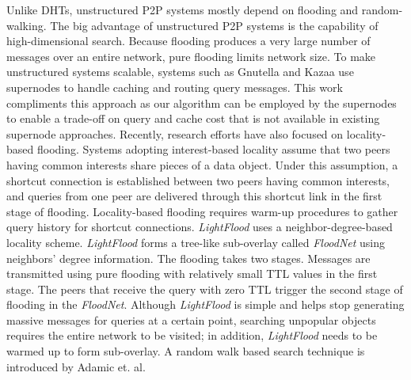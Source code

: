 \documentclass[conference]{IEEEtran}
\begin{document}

Unlike DHTs, unstructured P2P systems mostly depend on flooding and random-walking.
The big advantage of unstructured P2P systems 
is the capability of high-dimensional search.
Because flooding produces a very large number of
messages over an entire network, pure flooding limits network size. 
To make unstructured systems scalable, systems such as Gnutella and
Kazaa use supernodes to handle caching and routing query messages.
This work compliments this approach as our algorithm can be employed
by the supernodes to enable a trade-off on query and cache cost that
is not available in existing supernode approaches.
Recently, research efforts have also focused on locality-based flooding. Systems 
adopting interest-based locality\cite{Guo05,SMZ03} assume that 
two peers having common interests share pieces of a data object. 
Under this assumption, a shortcut 
connection is established between two peers having common interests, 
and queries from one peer are delivered through this 
shortcut link in the first stage of flooding. 
Locality-based flooding requires warm-up procedures to gather query 
history for shortcut connections. 
\textit{LightFlood}\cite{JiangGZW08} uses a neighbor-degree-based locality scheme. 
\textit{LightFlood} forms a tree-like sub-overlay called 
\textit{FloodNet} using neighbors' degree information. 
The flooding takes two stages.
Messages are transmitted using pure flooding with relatively small TTL values 
in the first stage. The peers that receive the query with zero TTL trigger 
the second stage of flooding in the \textit{FloodNet}. Although 
\textit{LightFlood} is simple and helps stop generating massive messages 
for queries at a certain point, searching unpopular objects requires  
the entire network to be visited; in addition, \textit{LightFlood} needs to 
be warmed up to form sub-overlay.  
A random walk based search technique is introduced by Adamic et. al. 
\end{document}
